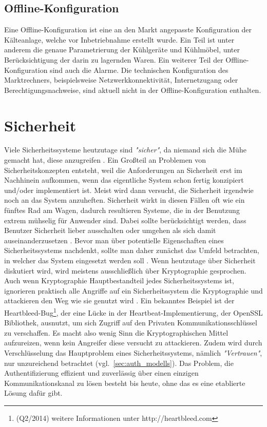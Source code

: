 \documentclass[11pt,a4paper]{report}
\begin{document}
\subsection{Offline-Konfiguration} 

Eine Offline-Konfiguration ist eine an den Markt angepasste Konfiguration der Kälteanlage, welche vor Inbetriebnahme erstellt wurde. Ein Teil ist unter anderem die genaue Parametrierung der Kühlgeräte und Kühlmöbel, unter Berücksichtigung der darin zu lagernden Waren. Ein weiterer Teil der Offline-Konfiguration sind auch die Alarme. Die technischen Konfiguration des Marktrechners, beispielsweise Netzwerkkonnektivität, Internetzugang oder Berechtigungsnachweise, sind aktuell nicht in der Offline-Konfiguration enthalten.

\section{Sicherheit} \label{sec:security_conzept}

Viele Sicherheitssysteme heutzutage sind \textit{"sicher"}, da niemand sich die Mühe gemacht hat, diese anzugreifen \cite{gutmann0}. Ein Großteil an Problemen von Sicherheitskonzepten entsteht, weil die Anforderungen an Sicherheit erst im Nachhinein aufkommen, wenn das eigentliche System schon fertig konzipiert und/oder implementiert ist. Meist wird dann versucht, die Sicherheit irgendwie noch an das System anzuheften. Sicherheit wirkt in diesen Fällen oft wie ein fünftes Rad am Wagen, dadurch resultieren Systeme, die in der Benutzung extrem mühselig für Anwender sind. Dabei sollte berücksichtigt werden, dass Benutzer Sicherheit lieber ausschalten oder umgehen als sich damit auseinanderzusetzen \cite{gutmann5}. Bevor man über potentielle Eigenschaften eines Sicherheitssystems nachdenkt, sollte man daher zunächst das Umfeld betrachten, in welcher das System eingesetzt werden soll \cite{gutmann4}. Wenn heutzutage über Sicherheit diskutiert wird, wird meistens ausschließlich über Kryptographie gesprochen. Auch wenn Kryptographie Hauptbestandteil jedes Sicherheitssystems ist, ignorieren praktisch alle Angriffe auf ein Sicherheitssystem die Kryptographie und attackieren den Weg wie sie genutzt wird \cite{gutmann1}. Ein bekanntes Beispiel ist der Heartbleed-Bug\footnote{(Q2/2014) weitere Informationen unter http://heartbleed.com}, der eine Lücke in der Heartbeat-Implementierung, der OpenSSL Bibliothek, ausnutzt, um sich Zugriff auf den Privaten Kommunikationsschlüssel zu verschaffen. Es macht also wenig Sinn die Kryptographischen Mittel aufzureizen, wenn kein Angreifer diese versucht zu attackieren. Zudem wird durch Verschlüsselung das Hauptproblem eines Sicherheitssystems, nämlich \textit{"Vertrauen"}, nur unzureichend betrachtet (vgl.~\ref{sec:auth_modells}). Das Problem, die Authentifizierung effizient und zuverlässig über einen einzigen Kommunikationskanal zu lösen besteht bis heute, ohne das es eine etablierte Lösung dafür gibt. 
\end{document}
